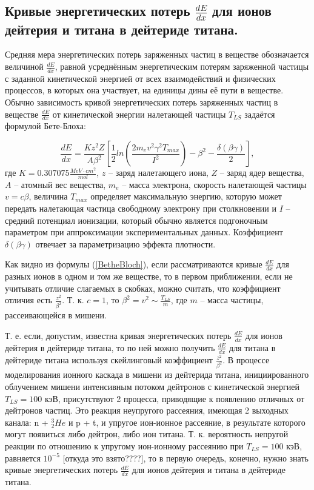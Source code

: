 \documentclass[a4paper,12pt]{article}
\begin{document}
\begin{large}
\subsection{Кривые энергетических потерь $\frac{dE}{dx}$ для ионов дейтерия и титана в дейтериде титана.}
\label{ValdEdx1}

	Средняя мера энергетических потерь заряженных частиц в веществе обозначается величиной $\frac{dE}{dx}$, равной усреднённым энергетическим потерям заряженной частицы с заданной кинетической энергией от всех взаимодействий и физических процессов, в которых она участвует, на единицы дины её пути в веществе.
	Обычно зависимость кривой энергетических потерь заряженных частиц в веществе $\frac{dE}{dx}$ от кинетической энергии налетающей частицы $T_{LS}$ задаётся формулой Бете-Блоха:
	
\begin{equation}
  \label{BetheBloch}
    \frac{dE}{dx}=\frac{Kz^2Z}{A\beta^2}\left[\frac{1}{2}ln\left(\frac{2m_ev^2\gamma^2T_{max}}{I^2}          \right)-\beta^2-\frac{\delta(\beta\gamma)}{2}\right],
\end{equation}
  	где $K=0.307075\frac{MeV\cdot cm^2}{mol}$, $z$ -- заряд налетающего иона, $Z$ -- заряд ядер вещества, $A$ -- атомный вес вещества, $m_e$ -- масса электрона, скорость налетающей частицы $v=c\beta$, величина $T_{max}$ определяет максимальную энергию, которую может передать налетающая частица свободному электрону при столкновении и $I$ -- средний потенциал ионизации, который обычно является подгоночным параметром при аппроксимации экспериментальных данных.
  	Коэффициент $\delta(\beta\gamma)$ отвечает за параметризацию эффекта плотности.
  
  	Как видно из формулы (\ref{BetheBloch}), если рассматриваются кривые $\frac{dE}{dx}$ для разных ионов в одном и том же веществе, то в первом приближении, если не учитывать отличие слагаемых в скобках, можно считать, что коэффициент отличия есть $\frac{z^2}{\beta^2}$.
  	Т. к. $c=1$, то $\beta^2=v^2 \sim \frac{T_{LS}}{m}$, где $m$ -- масса частицы, рассеивающейся в мишени.
  
  	Т. е. если, допустим, известна кривая энергетических потерь $\frac{dE}{dx}$ для ионов дейтерия в дейтериде титана, то по ней можно получить $\frac{dE}{dx}$ для титана в дейтериде титана используя скейлинговый коэффициент $\frac{z^2}{\beta^2}$.
 	В процессе моделирования ионного каскада  в мишени из дейтерида титана, инициированного облучением мишени интенсивным потоком дейтронов с кинетической энергией $T_{LS}=100$ кэВ, присутствуют 2 процесса, приводящие к появлению отличных от дейтронов частиц.
 	Это реакция неупругого рассеяния, имеющая 2 выходных канала: n + $^3_2He$ и p + t, и упругое ион-ионное рассеяние, в результате которого могут появиться либо дейтрон, либо ион титана.
 	Т. к. вероятность непругой реакции по отношению к упругому ион-ионному рассеянию при $T_{LS}=100$ кэВ, равняется $10^{-5}$ [откуда это взято????], то в первую очередь, конечно, нужно знать кривые энергетических потерь $\frac{dE}{dx}$ для ионов дейтерия и титана в дейтериде титана.
  

\end{large}
\end{document}
